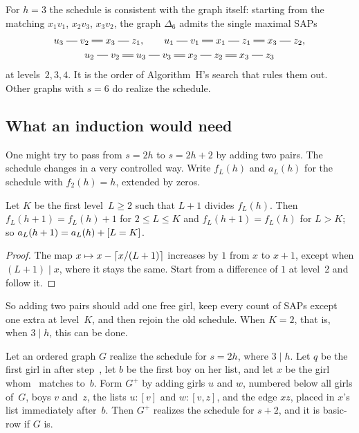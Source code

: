 For $h=3$ the schedule is consistent with the graph itself: starting from
the matching $x_1v_1$, $x_2v_3$, $x_3v_2$, the graph $\Delta_6$ admits the
single maximal SAPs
\begin{gather*}
  u_3\sg v_2\db x_3\sg z_1,\qquad
  u_1\sg v_1\db x_1\sg z_1\db x_3\sg z_2,\\
  u_2\sg v_2\db u_3\sg v_3\db x_2\sg z_2\db x_3\sg z_3
\end{gather*}
at levels~$2,3,4$. It is the order of Algorithm~H's search that rules them
out. Other graphs with $s=6$ do realize the schedule.

\subsection{What an induction would need}

One might try to pass from $s=2h$ to $s=2h+2$ by adding two pairs. The
schedule changes in a very controlled way. Write $f_L(h)$ and $a_L(h)$ for
the schedule with $f_2(h)=h$, extended by zeros.

\begin{lemma}
\label{lem:step}
Let $K$ be the first level~$L\ge2$ such that $L+1$ divides $f_L(h)$. Then
$f_L(h+1)=f_L(h)+1$ for $2\le L\le K$ and $f_L(h+1)=f_L(h)$ for $L>K$; so
$a_L(h+1)=a_L(h)+[L=K]$.
\end{lemma}

\begin{proof}
The map $x\mapsto x-\lceil x/(L+1)\rceil$ increases by $1$ from $x$ to $x+1$,
except when $(L+1)\mid x$, where it stays the same. Start from a difference
of $1$ at level~2 and follow it.
\end{proof}

So adding two pairs should add one free girl, keep every count of SAPs
except one extra at level~$K$, and then rejoin the old schedule. When $K=2$,
that is, when $3\mid h$, this can be done.

\begin{proposition}
\label{prop:pad}
Let an ordered graph $G$ realize the schedule for $s=2h$, where $3\mid h$.
Let $q$ be the first girl in  after step~, let $b$ be the first
boy on her list, and let $x$ be the girl whom~ matches to~$b$. Form $G^+$
by adding girls $u$ and $w$, numbered below all girls of~$G$, boys $v$
and~$z$, the lists $u\colon[v]$ and $w\colon[v,z]$, and the edge $xz$, placed
in $x$'s list immediately after~$b$. Then $G^+$ realizes the schedule for
$s+2$, and it is basic-row if $G$ is.
\end{proposition}

